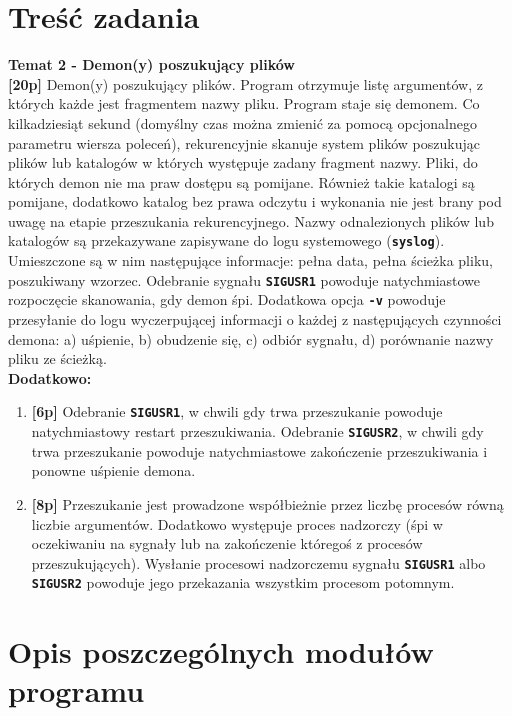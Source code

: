 \documentclass{article}
\begin{document}
	\section{Treść zadania}
	
	\textbf{Temat 2 - Demon(y) poszukujący plików}\\
	
	\textbf{[20p]} Demon(y) poszukujący plików. Program otrzymuje listę argumentów, z których każde jest fragmentem nazwy pliku. Program staje się demonem. Co kilkadziesiąt sekund (domyślny czas można zmienić za pomocą opcjonalnego parametru wiersza poleceń), rekurencyjnie skanuje system plików poszukując plików lub katalogów w których występuje zadany fragment nazwy. Pliki, do których demon nie ma praw dostępu są pomijane. Również takie katalogi są pomijane, dodatkowo katalog bez prawa odczytu i wykonania nie jest brany pod uwagę na etapie przeszukania rekurencyjnego. Nazwy odnalezionych plików lub katalogów są przekazywane zapisywane do logu systemowego (\textbf{\texttt{syslog}}). Umieszczone są w nim następujące informacje: pełna data, pełna ścieżka pliku, poszukiwany wzorzec. Odebranie sygnału \textbf{\texttt{SIGUSR1}} powoduje natychmiastowe rozpoczęcie skanowania, gdy demon śpi. Dodatkowa opcja \textbf{\texttt{-v}} powoduje przesyłanie do logu wyczerpującej informacji o każdej z następujących czynności demona: a) uśpienie, b) obudzenie się, c) odbiór sygnału, d) porównanie nazwy pliku ze ścieżką.\\
	
	\textbf{Dodatkowo:}
	\begin{enumerate}[label=\alph*)]
		\item \textbf{[6p]} Odebranie \textbf{\texttt{SIGUSR1}}, w chwili gdy trwa przeszukanie powoduje natychmiastowy restart przeszukiwania. Odebranie \textbf{\texttt{SIGUSR2}}, w chwili gdy trwa przeszukanie powoduje natychmiastowe zakończenie przeszukiwania i ponowne uśpienie demona.
		\item \textbf{[8p]} Przeszukanie jest prowadzone współbieżnie przez liczbę procesów równą liczbie argumentów. Dodatkowo występuje proces nadzorczy (śpi w oczekiwaniu na sygnały lub na zakończenie któregoś z procesów przeszukujących). Wysłanie procesowi nadzorczemu sygnału \textbf{\texttt{SIGUSR1}} albo \textbf{\texttt{SIGUSR2}} powoduje jego przekazania wszystkim procesom potomnym.
	\end{enumerate}
	
	\section{Opis poszczególnych modułów programu}
	
\end{document}

